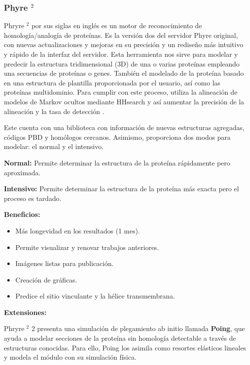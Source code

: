 \documentclass[11pt, letterpaper, spanish]{article}
\begin{document}
{{        \subsubsection{Phyre \texorpdfstring{$^2$}{Lg}}
        \par{Phryre {$^2$}  por sus siglas en inglés es un motor de reconocimiento de homología/analogía de proteínas. Es la versión dos del servidor Phyre original, con nuevas actualizaciones y mejoras en su precisión y un rediseño más intuitivo y rápido de la interfaz del servidor. Esta herramienta nos sirve para modelar y predecir la estructura tridimensional (3D) de una o varias proteínas empleando una secuencias de proteínas o genes. También el modelado de la proteína basado en una estructura de plantilla proporcionada por el usuario, así como las proteínas multidominio. Para cumplir con este proceso, utiliza la alineación de modelos de Markov ocultos mediante HHsearch y así aumentar la precisión de la alineación y la tasa de detección \cite{Kelley_2017}.}  
        \par{Este cuenta con una biblioteca con información de nuevas estructuras agregadas, códigos PBD y homólogos cercanos. Asimismo, proporciona dos modos para modelar: el normal y el intensivo.}
            \par{\textbf{Normal:} Permite determinar la estructura de la proteína rápidamente pero aproximada.}
            \par{\textbf{Intensivo:} Permite determinar la estructura de la proteína más exacta pero el proceso es tardado.}
        \par{\textbf{Beneficios:}}
        \begin{itemize}
            \item Más longevidad en los resultados (1 mes).
            \item Permite visualizar y renovar trabajos anteriores.
            \item Imágenes listas para publicación.
            \item Creación de gráficas.
            \item Predice el sitio vinculante y la hélice transmembrana.
        \end{itemize}
        \par{\textbf{Extensiones:}}
        \par{Phryre {$^2$} 2 presenta una simulación de plegamiento ab initio llamada \textbf{Poing}, que ayuda a modelar secciones de la proteína sin homología detectable a través de estructuras conocidas. Para ello, Poing los asimila como resortes elásticos lineales y modela el módulo con su simulación física.}
}}
\end{document}
